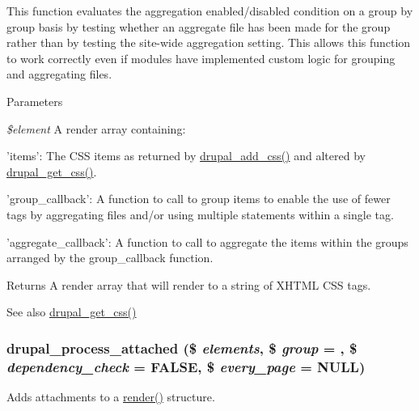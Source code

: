 This function evaluates the aggregation enabled/disabled condition on a group by group basis by testing whether an aggregate file has been made for the group rather than by testing the site-\/wide aggregation setting. This allows this function to work correctly even if modules have implemented custom logic for grouping and aggregating files.


\begin{DoxyParams}{Parameters}
\item[{\em \$element}]A render array containing:
\begin{DoxyItemize}
\item 'items': The CSS items as returned by \hyperlink{common_8inc_a2c5bb2667efb44b02f1a105c0bfdebe5}{drupal\_\-add\_\-css()} and altered by \hyperlink{common_8inc_a2e308371f339fbb54967045ccbe4e88c}{drupal\_\-get\_\-css()}.
\item 'group\_\-callback': A function to call to group items to enable the use of fewer tags by aggregating files and/or using multiple  statements within a single tag.
\item 'aggregate\_\-callback': A function to call to aggregate the items within the groups arranged by the group\_\-callback function.
\end{DoxyItemize}\end{DoxyParams}
\begin{DoxyReturn}{Returns}
A render array that will render to a string of XHTML CSS tags.
\end{DoxyReturn}
\begin{DoxySeeAlso}{See also}
\hyperlink{common_8inc_a2e308371f339fbb54967045ccbe4e88c}{drupal\_\-get\_\-css()} 
\end{DoxySeeAlso}
\hypertarget{common_8inc_a31e3a25219e1d3a2f74670694b30dee6}{
\subsubsection[{drupal\_\-process\_\-attached}]{\setlength{\rightskip}{0pt plus 5cm}drupal\_\-process\_\-attached (\$ {\em elements}, \/  \$ {\em group} = {}, \/  \$ {\em dependency\_\-check} = {\ttfamily FALSE}, \/  \$ {\em every\_\-page} = {\ttfamily NULL})}}
\label{common_8inc_a31e3a25219e1d3a2f74670694b30dee6}
Adds attachments to a \hyperlink{common_8inc_a5f4b2009c1caf78549203cec9b324305}{render()} structure.

